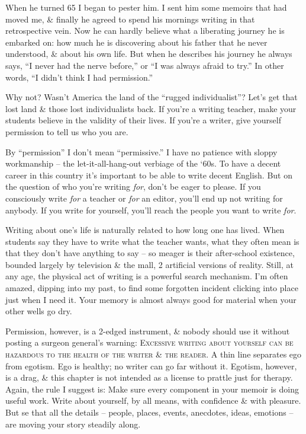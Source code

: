 \documentclass{article}
\begin{document}
When he turned 65 I began to pester him. I sent him some memoirs that had moved me, \& finally he agreed to spend his mornings writing in that retrospective vein. Now he can hardly believe what a liberating journey he is embarked on: how much he is discovering about his father that he never understood, \& about his own life. But when he describes his journey he always says, ``I never had the nerve before,'' or ``I was always afraid to try.'' In other words, ``I didn't think I had permission.''

Why not? Wasn't America the land of the ``rugged individualist''? Let's get that lost land \& those lost individualists back. If you're a writing teacher, make your students believe in the validity of their lives. If you're a writer, give yourself permission to tell us who you are.

By ``permission'' I don't mean ``permissive.'' I have no patience with sloppy workmanship -- the let-it-all-hang-out verbiage of the `60s. To have a decent career in this country it's important to be able to write decent English. But on the question of who you're writing \textit{for}, don't be eager to please. If you consciously write \textit{for} a teacher or \textit{for} an editor, you'll end up not writing for anybody. If you write for yourself, you'll reach the people you want to write \textit{for}.

Writing about one's life is naturally related to how long one has lived. When students say they have to write what the teacher wants, what they often mean is that they don't have anything to say -- so meager is their after-school existence, bounded largely by television \& the mall, 2 artificial versions of reality. Still, at any age, the physical act of writing is a powerful search mechanism. I'm often amazed, dipping into my past, to find some forgotten incident clicking into place just when I need it. Your memory is almost always good for material when your other wells go dry.

Permission, however, is a 2-edged instrument, \& nobody should use it without posting a surgeon general's warning: \textsc{Excessive writing about yourself can be hazardous to the health of the writer \& the reader}. A thin line separates ego from egotism. Ego is healthy; no writer can go far without it. Egotism, however, is a drag, \& this chapter is not intended as a license to prattle just for therapy. Again, the rule I suggest is: Make sure every component in your memoir is doing useful work. Write about yourself, by all means, with confidence \& with pleasure. But se that all the details -- people, places, events, anecdotes, ideas, emotions -- are moving your story steadily along.
\end{document}
